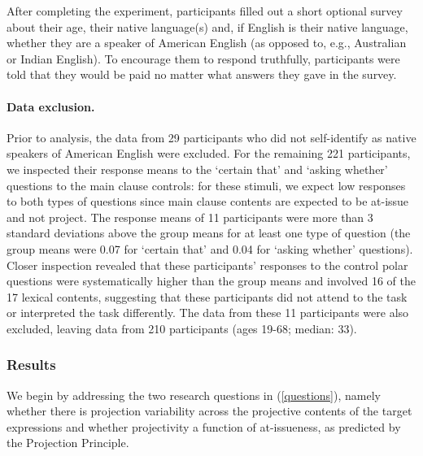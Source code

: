\documentclass[11pt,fleqn]{article}
\newcommand{\6}{\mbox{$[\hspace*{-.6mm}[$}}
\newcommand{\9}{\mbox{$]\hspace*{-.6mm}]$}}
\begin{document}
After completing the experiment, participants filled out a short optional survey about their age, their native language(s) and, if English is their native language, whether they are a speaker of American English (as opposed to, e.g., Australian or Indian English). To encourage them to respond truthfully, participants were told that they would be paid no matter what answers they gave in the survey.

\paragraph{Data exclusion.}
Prior to analysis, the data from 29 participants who did not self-identify as native speakers of American English were excluded. For the remaining 221 participants, we inspected their response means to the `certain that' and `asking whether' questions 
to the main clause controls: for these stimuli, we expect low responses to both types of questions since main clause contents are expected to be at-issue and not project. The response means of 11 participants were more than 3 standard deviations above the group means for at least one type of question (the group means were 0.07 for `certain that' and 0.04 for `asking whether' questions). Closer inspection revealed that these participants' responses to the control polar questions were systematically higher than the group means and involved 16 of the 17 lexical contents, suggesting that these participants did not attend to the task or interpreted the task differently. The data from these 11 participants were also excluded, leaving data from 210 participants (ages 19-68; median: 33).  


\subsubsection{Results}

We begin by addressing the two research questions in (\ref{questions}), namely whether there is projection variability across the projective contents of the target expressions and whether projectivity a function of at-issueness, as predicted by the Projection Principle. 
\end{document}
